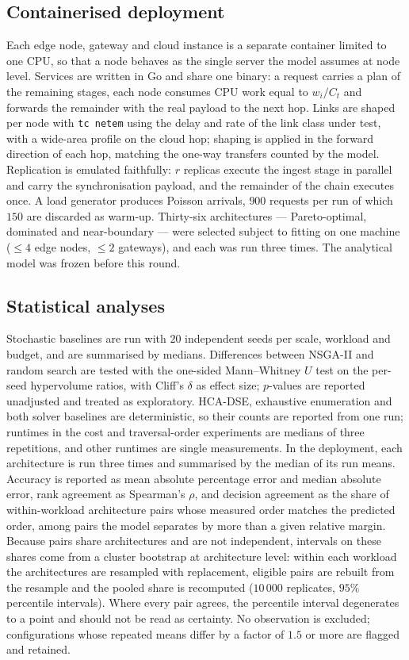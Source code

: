 \documentclass[pdflatex,sn-nature,lineno]{sn-jnl}
\begin{document}
\subsection{Containerised deployment}
Each edge node, gateway and cloud instance is a separate container limited to one CPU, so
that a node behaves as the single server the model assumes at node level. Services are
written in Go and share one binary: a request carries a plan of the remaining stages,
each node consumes CPU work equal to $w_i/C_t$ and forwards the remainder with the real
payload to the next hop. Links are shaped per node with \texttt{tc netem}
\cite{hemminger2005netem} using the delay and rate of the link class under test, with a
wide-area profile on the cloud hop; shaping is applied in the forward direction of each
hop, matching the one-way transfers counted by the model. Replication is emulated
faithfully: $r$ replicas execute the ingest stage in parallel and carry the
synchronisation payload, and the remainder of the chain executes once. A load generator
produces Poisson arrivals, $900$ requests per run of which $150$ are discarded as warm-up.
Thirty-six architectures --- Pareto-optimal, dominated and near-boundary --- were selected
subject to fitting on one machine ($\le4$ edge nodes, $\le2$ gateways), and each was run
three times. The analytical model was frozen before this round.

\subsection{Statistical analyses}
Stochastic baselines are run with $20$ independent seeds per scale, workload and budget,
and are summarised by medians. Differences between NSGA-II and random search are tested
with the one-sided Mann--Whitney $U$ test\cite{mann1947whitney} on the per-seed
hypervolume ratios, with Cliff's $\delta$\cite{cliff1993delta} as effect size;
$p$-values are reported unadjusted and treated as exploratory. HCA-DSE, exhaustive
enumeration and both solver baselines are deterministic, so their counts are reported
from one run; runtimes in the cost and traversal-order experiments are medians of three
repetitions, and other runtimes are single measurements. In the deployment, each architecture
is run three times and summarised by the median of its run means. Accuracy is reported as
mean absolute percentage error and median absolute error, rank agreement as Spearman's
$\rho$, and decision agreement as the share of within-workload architecture pairs whose
measured order matches the predicted order, among pairs the model separates by more than
a given relative margin. Because pairs share architectures and are not independent, intervals on these shares
come from a cluster bootstrap at architecture level: within each workload the
architectures are resampled with replacement, eligible pairs are rebuilt from the
resample and the pooled share is recomputed ($10\,000$ replicates, $95\%$ percentile
intervals). Where every pair agrees, the percentile interval degenerates to a point and
should not be read as certainty. No
observation is excluded; configurations whose repeated means differ by a factor of $1.5$
or more are flagged and retained.
\end{document}

